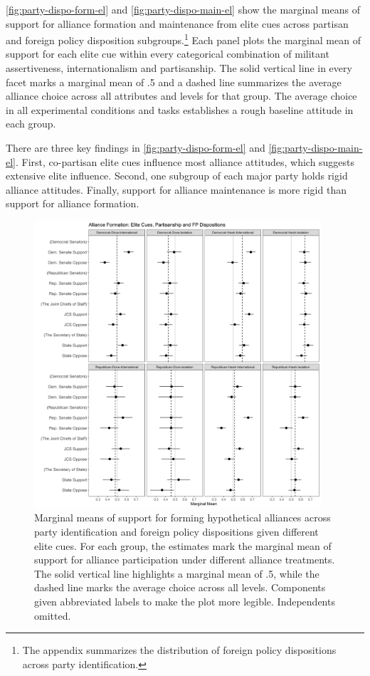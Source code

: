\documentclass[12pt]{article}
\begin{document}
\autoref{fig:party-dispo-form-el} and \autoref{fig:party-dispo-main-el} show the marginal means of support for alliance formation and maintenance from elite cues across partisan and foreign policy disposition subgroups.\footnote{The appendix summarizes the distribution of foreign policy dispositions across party identification.} 
Each panel plots the marginal mean of support for each elite cue within every categorical combination of militant assertiveness, internationalism and partisanship.
The solid vertical line in every facet marks a marginal mean of .5 and a dashed line summarizes the average alliance choice across all attributes and levels for that group.
The average choice in all experimental conditions and tasks establishes a rough baseline attitude in each group.  


There are three key findings in \autoref{fig:party-dispo-form-el} and \autoref{fig:party-dispo-main-el}. 
First, co-partisan elite cues influence most alliance attitudes, which suggests extensive elite influence. 
Second, one subgroup of each major party holds rigid alliance attitudes. 
Finally, support for alliance maintenance is more rigid than support for alliance formation. 



\begin{figure}[htpb]
	\centering
		\includegraphics[width=0.95\textwidth]{../figures/party-dispo-form-el.png}
	\caption{Marginal means of support for forming hypothetical alliances across party identification and foreign policy dispositions given different elite cues. For each group, the estimates mark the marginal mean of support for alliance participation under different alliance treatments. The solid vertical line highlights a marginal mean of .5, while the dashed line marks the average choice across all levels. Components given abbreviated labels to make the plot more legible. Independents omitted.}
	\label{fig:party-dispo-form-el}
\end{figure}
\end{document}
